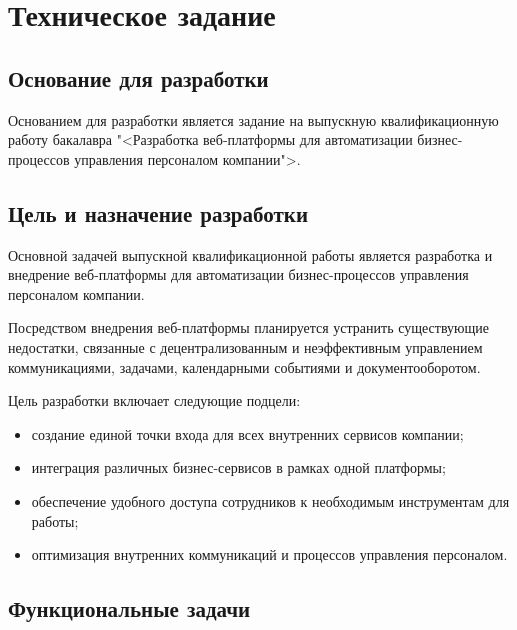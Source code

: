 \section{Техническое задание}
\subsection{Основание для разработки}

Основанием для разработки является задание на выпускную квалификационную работу бакалавра "<Разработка веб-платформы для автоматизации бизнес-процессов управления персоналом компании">.

\subsection{Цель и назначение разработки}

Основной задачей выпускной квалификационной работы является разработка и внедрение веб-платформы для автоматизации бизнес-процессов управления персоналом компании.

Посредством внедрения веб-платформы планируется устранить существующие недостатки, связанные с децентрализованным и неэффективным управлением коммуникациями, задачами, календарными событиями и документооборотом.

Цель разработки включает следующие подцели:

\begin{itemize}
\item создание единой точки входа для всех внутренних сервисов компании;
\item интеграция различных бизнес-сервисов в рамках одной платформы;
\item обеспечение удобного доступа сотрудников к необходимым инструментам для работы;
\item оптимизация внутренних коммуникаций и процессов управления персоналом.
\end{itemize}

\subsection{Функциональные задачи}


